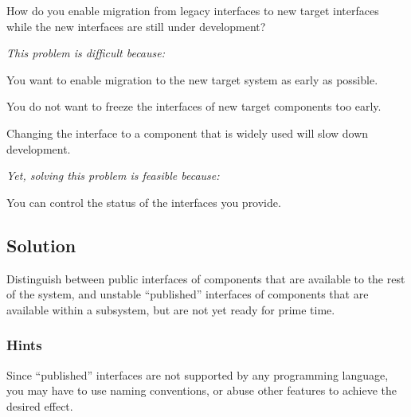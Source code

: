 \documentclass[a4paper,10pt,twoside]{book}
\begin{document}
How do you enable migration from legacy interfaces to new target interfaces while the new interfaces are still under development?

\emph{This problem is difficult because:} 

\begin{bulletlist}
\item You want to enable migration to the new target system as early as possible.

\item You do not want to freeze the interfaces of new target components too early.

\item Changing the interface to a component that is widely used will slow down development.
\end{bulletlist}

\emph{Yet, solving this problem is feasible because:}

\begin{bulletlist}
\item You can control the status of the interfaces you provide.
\end{bulletlist}

\subsection*{Solution}

Distinguish between public interfaces of components that are available to the rest of the system, and unstable ``published'' interfaces of components that are available within a subsystem, but are not yet ready for prime time.

\subsubsection*{Hints}

Since ``published'' interfaces are not supported by any programming language, you may have to use naming conventions, or abuse other features to achieve the desired effect.
\end{document}
